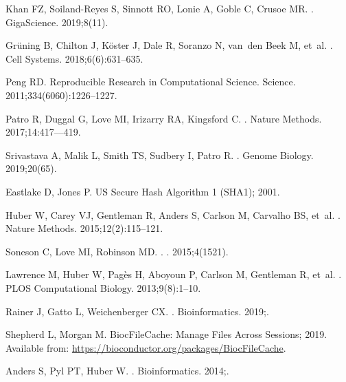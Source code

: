 \documentclass[10pt,letterpaper]{article}
\begin{document}
\begin{thebibliography}{10}
Khan FZ, Soiland-Reyes S, Sinnott RO, Lonie A, Goble C, Crusoe MR.
.
\newblock GigaScience. 2019;8(11).

Gr{\"u}ning B, Chilton J, K{\"o}ster J, Dale R, Soranzo N, van~den Beek M,
  et~al.
.
\newblock Cell Systems. 2018;6(6):631--635.

Peng RD.
\newblock Reproducible Research in Computational Science.
\newblock Science. 2011;334(6060):1226--1227.

Patro R, Duggal G, Love MI, Irizarry RA, Kingsford C.
.
\newblock Nature Methods. 2017;14:417--–419.

Srivastava A, Malik L, Smith TS, Sudbery I, Patro R.
.
\newblock Genome Biology. 2019;20(65).

Eastlake D, Jones P. {US Secure Hash Algorithm 1 (SHA1)}; 2001.

Huber W, Carey VJ, Gentleman R, Anders S, Carlson M, Carvalho BS, et~al.
.
\newblock Nature Methods. 2015;12(2):115--121.

Soneson C, Love MI, Robinson MD.
.
. 2015;4(1521).

Lawrence M, Huber W, Pagès H, Aboyoun P, Carlson M, Gentleman R, et~al.
.
\newblock PLOS Computational Biology. 2013;9(8):1--10.

Rainer J, Gatto L, Weichenberger CX.
.
\newblock Bioinformatics. 2019;.

Shepherd L, Morgan M. {BiocFileCache: Manage Files Across Sessions}; 2019.
\newblock Available from:
  \url{https://bioconductor.org/packages/BiocFileCache}.

Anders S, Pyl PT, Huber W.
.
\newblock Bioinformatics. 2014;.


\end{thebibliography}
\end{document}
